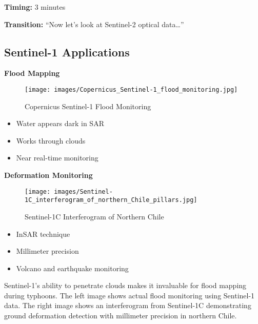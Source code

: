 \documentclass[
  letterpaper,
  DIV=11,
  numbers=noendperiod]{scrartcl}
\providecommand{\tightlist}{%
  \setlength{\itemsep}{0pt}\setlength{\parskip}{0pt}}
\begin{document}
\textbf{Timing:} 3 minutes

\textbf{Transition:} ``Now let's look at Sentinel-2 optical
data\ldots{}''

\subsection{Sentinel-1 Applications}\label{sentinel-1-applications}

\textbf{Flood Mapping}

\begin{figure}[H]

{\centering \texttt{[image: images/Copernicus\_Sentinel-1\_flood\_monitoring.jpg]}

}

\caption{Copernicus Sentinel-1 Flood Monitoring}

\end{figure}%

\begin{itemize}
\tightlist
\item
  Water appears dark in SAR
\item
  Works through clouds
\item
  Near real-time monitoring
\end{itemize}

\textbf{Deformation Monitoring}

\begin{figure}[H]

{\centering \texttt{[image: images/Sentinel-1C\_interferogram\_of\_northern\_Chile\_pillars.jpg]}

}

\caption{Sentinel-1C Interferogram of Northern Chile}

\end{figure}%

\begin{itemize}
\tightlist
\item
  InSAR technique
\item
  Millimeter precision
\item
  Volcano and earthquake monitoring
\end{itemize}

Sentinel-1's ability to penetrate clouds makes it invaluable for flood
mapping during typhoons. The left image shows actual flood monitoring
using Sentinel-1 data. The right image shows an interferogram from
Sentinel-1C demonstrating ground deformation detection with millimeter
precision in northern Chile.
\end{document}
